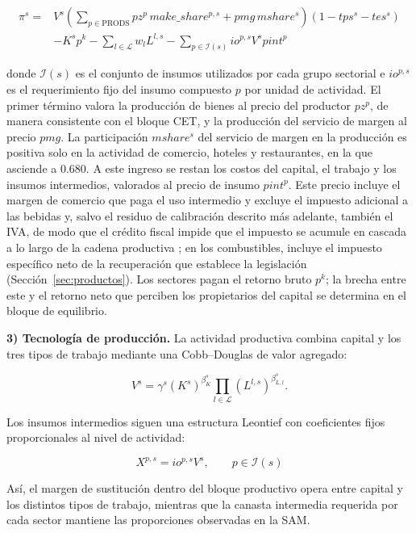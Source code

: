 \documentclass[11pt]{article}
\begin{document}
\[
\begin{aligned}
\pi^{s} ={}& V^{s}\left(\sum_{p \in \mathrm{PRODS}} pz^{p}\, make\_share^{p,s}+pmg\, mshare^{s}\right)\left(1-tps^{s}-tes^{s}\right)\\
&- K^{s} p^{k} - \sum_{l \in \mathcal{L}} w_{l} L^{l,s} - \sum_{p \in \mathcal{I}(s)} io^{p,s} V^{s} pint^{p}
\end{aligned}
\]

donde \(\mathcal{I}(s)\) es el conjunto de insumos utilizados por cada grupo sectorial e \(io^{p,s}\) es el requerimiento fijo del insumo compuesto $p$ por unidad de actividad. El primer término valora la producción de bienes al precio del productor $pz^{p}$, de manera consistente con el bloque CET, y la producción del servicio de margen al precio $pmg$. La participación $mshare^{s}$ del servicio de margen en la producción es positiva solo en la actividad de comercio, hoteles y restaurantes, en la que asciende a 0.680. A este ingreso se restan los costos del capital, el trabajo y los insumos intermedios, valorados al precio de insumo $pint^{p}$. Este precio incluye el margen de comercio que paga el uso intermedio y excluye el impuesto adicional a las bebidas y, salvo el residuo de calibración descrito más adelante, también el IVA, de modo que el crédito fiscal impide que el impuesto se acumule en cascada a lo largo de la cadena productiva \cite{ebrill_etal_2001}; en los combustibles, incluye el impuesto específico neto de la recuperación que establece la legislación (Sección~\ref{sec:productos}). Los sectores pagan el retorno bruto $p^{k}$; la brecha entre este y el retorno neto que perciben los propietarios del capital se determina en el bloque de equilibrio.

\textbf{3) Tecnología de producción.} La actividad productiva combina capital y los tres tipos de trabajo mediante una Cobb--Douglas de valor agregado:

\[
V^{s} = \gamma^{s} \left(K^{s}\right)^{\beta_{K}^{s}} \prod_{l \in \mathcal{L}} \left(L^{l,s}\right)^{\beta_{L,l}^{s}}.
\]

Los insumos intermedios siguen una estructura Leontief con coeficientes fijos proporcionales al nivel de actividad:

\[
X^{p,s} = io^{p,s} V^{s}, \qquad p \in \mathcal{I}(s)
\]

Así, el margen de sustitución dentro del bloque productivo opera entre capital y los distintos tipos de trabajo, mientras que la canasta intermedia requerida por cada sector mantiene las proporciones observadas en la SAM.
\end{document}
